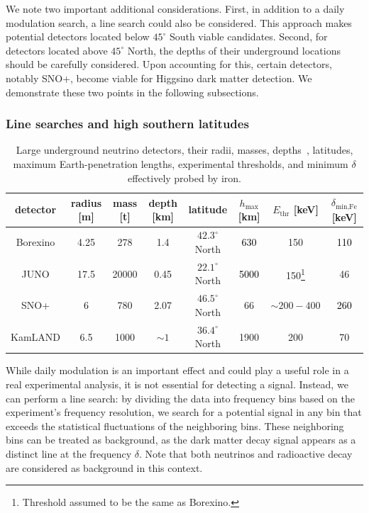 \documentclass[aps,prd,amsmath,amssymb,10pt,letterpaper,balancelastpage,showpacs,superscriptaddress,nofootinbib,floatfix,notitlepage,longbibliography,twocolumn
]{revtex4-2}
\newcommand{\numcolor}[1]{\textcolor{black}{#1}}
\newcommand{\hmax}{h_{\text{max}}}
\newcommand{\deltaminFe}{\delta_{\text{min,Fe}}}
\newcommand{\Ethr}{E_{\text{thr}}}
\begin{document}
We note two important additional considerations. First, in addition to a daily modulation search, a line search could also be considered. This approach makes potential detectors located below $45^\circ$ South viable candidates. Second, for detectors located above $45^\circ$ North, the depths of their underground locations should be carefully considered. Upon accounting for this, certain detectors, notably SNO+, become viable for Higgsino dark matter detection. We demonstrate these two points in the following subsections.

\subsubsection{Line searches and high southern latitudes\label{sec:line search and south}}
\begin{table}[t!]
    \centering
    \begin{tabular}{|c|c|c|c|c|c|c|c|} \hline 
         detector&  radius [m] &mass [t]&  depth [km]& latitude  &$\hmax$ [km] & $\Ethr$ [keV] &$\deltaminFe$ [keV] \\ \hline 
         Borexino&  4.25 &278&  1.4& $42.3^{\circ}$ North&\numcolor{630}&150 &\numcolor{110}\\ \hline 
         JUNO&  17.5 &20000&  0.45& $22.1^{\circ}$ North  &\numcolor{5000}&150\footnote{Threshold assumed to be the same as Borexino.}&46 \\ \hline 
         SNO+&  6 &780&  2.07 & $46.5^{\circ}$ North  &66 & $\sim 200-400$&\numcolor{260}\\\hline
 KamLAND& 6.5& 1000& $\sim 1$& $36.4^{\circ}$ North& 1900& 200&70\\\hline
    \end{tabular}
    \caption{Large underground neutrino detectors, their radii, masses, depths~\cite{JUNO_Depth, SNO+Depth, KamlandDepth}, latitudes, maximum Earth-penetration lengths, experimental thresholds, and minimum $\delta$ effectively probed by iron.}
    \label{tab: detectors}
\end{table}
While daily modulation is an important effect and could play a useful role in a real experimental analysis, it is not essential for detecting a signal. Instead, we can perform a line search: by dividing the data into frequency bins based on the experiment’s frequency resolution, we search for a potential signal in any bin that exceeds the statistical fluctuations of the neighboring bins. These neighboring bins can be treated as background, as the dark matter decay signal appears as a distinct line at the frequency $\delta$. Note that both neutrinos and radioactive decay are considered as background in this context.
\end{document}
